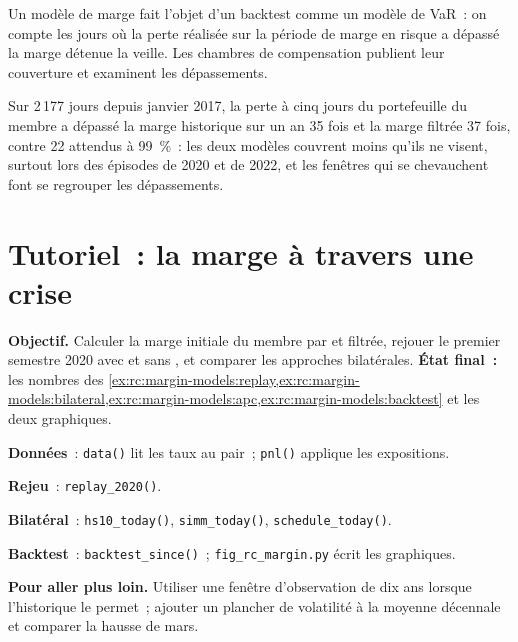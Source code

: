 Un modèle de marge fait l'objet d'un backtest comme un modèle de VaR~: on compte les jours où la perte réalisée sur
la période de marge en risque a dépassé la marge détenue la veille. Les chambres de compensation publient leur couverture
et examinent les dépassements.

\begin{example}\label{ex:rc:margin-models:backtest}
Sur 2\,177 jours depuis janvier 2017, la perte à cinq jours du portefeuille du membre a dépassé la marge
historique sur un an 35 fois et la marge filtrée 37 fois, contre 22 attendus à 99~\%~: les deux modèles
couvrent moins qu'ils ne visent, surtout lors des épisodes de 2020 et de 2022, et les fenêtres qui se
chevauchent font se regrouper les dépassements.
\end{example}

\section{Tutoriel~: la marge à travers une crise}\label{tut:rc:margin-models:tutorial}

\begin{tutorial}
\textbf{Objectif.} Calculer la marge initiale du membre par  et filtrée, rejouer le
premier semestre 2020 avec et sans , et comparer les approches bilatérales.
\textbf{État final~:} les nombres des
\cref{ex:rc:margin-models:replay,ex:rc:margin-models:bilateral,ex:rc:margin-models:apc,ex:rc:margin-models:backtest}
et les deux graphiques.
\begin{tutsteps}
\item \textbf{Données}~: \texttt{data()} lit les taux au pair~; \texttt{pnl()} applique les expositions.
\item \textbf{Rejeu}~: \texttt{replay\_2020()}.
\item \textbf{Bilatéral}~: \texttt{hs10\_today()}, \texttt{simm\_today()}, \texttt{schedule\_today()}.
\item \textbf{Backtest}~: \texttt{backtest\_since()}~; \texttt{fig\_rc\_margin.py} écrit les graphiques.
\end{tutsteps}
\textbf{Pour aller plus loin.} Utiliser une fenêtre d'observation de dix ans lorsque l'historique le permet~; ajouter un plancher de volatilité
à la moyenne décennale et comparer la hausse de mars.
\end{tutorial}

